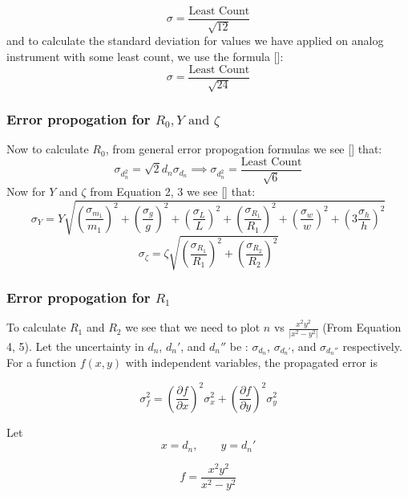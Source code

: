 \documentclass[%
sor,
jor,
 amsmath,amssymb,
 reprint,
longbibliography,
]{revtex4-2}
\begin{document}
\begin{equation}
\sigma = \frac{\text{Least Count}}{\sqrt{12}}
\end{equation}
and to calculate the standard deviation for values we have applied on analog instrument with some least count, we use the formula [\cite{tewari_uncertainty}]: 
\begin{equation}
\sigma = \frac{\text{Least Count}}{\sqrt{24}}
\end{equation}


\subsubsection{Error propogation for $R_0, Y \text{ and } \zeta$}
Now to calculate $R_0$, from general error propogation formulas we see [\cite{taylor_error_analysis}] that:
\begin{equation}
\boxed{
\sigma_{d_n^2} =  \sqrt 2 d_n  \sigma_{d_n} \implies \sigma_{d_n^2} = \frac{\text{Least Count}}{\sqrt 6}
}
\end{equation}
Now for $Y$ and $\zeta$ from Equation 2, 3 we see [\cite{taylor_error_analysis}] that:
\begin{equation}
\sigma_Y = Y \sqrt{
\left(\frac{\sigma_{m_1}}{m_1}\right)^2 +
\left(\frac{\sigma_g}{g}\right)^2 +
\left(\frac{\sigma_L}{L}\right)^2 +
\left(\frac{\sigma_{R_1}}{R_1}\right)^2 +
\left(\frac{\sigma_w}{w}\right)^2 +
\left(3\frac{\sigma_h}{h}\right)^2
}
\end{equation}
\begin{equation}
\sigma_{\zeta} =
\zeta \sqrt{
\left(\frac{\sigma_{R_1}}{R_1}\right)^2 +
\left(\frac{\sigma_{R_2}}{R_2}\right)^2
}
\end{equation}

\subsubsection{Error propogation for $R_1$}
To calculate $R_1$ and $R_2$ we see that we need to plot $n$ vs $\frac{x^2y^2}{|x^2 - y^2|}$ (From Equation 4, 5). Let the uncertainty in $d_n$, $d_n'$, and $d_n''$ be :
$\sigma_{d_n}$, $\sigma_{d_n'}$, and $\sigma_{d_n''}$ respectively. For a function $f(x,y)$ with independent variables, the propagated error is

\[
\sigma_f^2 =
\left(\frac{\partial f}{\partial x}\right)^2\sigma_x^2 +
\left(\frac{\partial f}{\partial y}\right)^2\sigma_y^2
\]

Let
\[
x=d_n, \qquad y=d_n'
\]

\[
f=\frac{x^2y^2}{x^2-y^2}
\]
\end{document}
